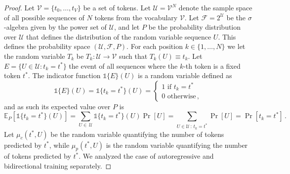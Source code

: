 \begin{proof}
%
Let $\mathcal{V} = \{t_0, \dots, t_V\}$ be a set of tokens.
%
Let \( \mathcal{U} = \mathcal{V}^N \) denote the sample space of all possible sequences of \( N \) tokens from the vocabulary \( \mathcal{V} \). 
%
Let \( \mathcal{F} = 2^{\mathcal{U}} \) be the \(\sigma\)-algebra given by the power set of \( \mathcal{U} \), and let \( P \) be the probability distribution over \( \mathcal{U} \) that defines the distribution of the random variable sequence \( U \). 
%
This defines the probability space \( (\mathcal{U}, \mathcal{F}, P) \).
%
For each position $k \in \{1, \dots, N\}$ we let the random variable $T_k$ be $T_k: \mathcal{U} \rightarrow \mathcal{V}$ such that $T_k(U) \equiv t_k$.
%
Let $E = \{U \in \mathcal{U}: t_k = t^*\}$ the event of all sequences where the $k$-th token is a fixed token $t^*$. 
%
The indicator function $\mathds{1}\{E\}(U)$ is a random variable defined as
%
\begin{equation}
\mathds{1}\{E\}(U) = \mathds{1}\{t_k = t^*\}(U) =
\begin{cases}
    1 \,\,\text{if} \,\,t_k = t^*\\
    0 \,\, \text{otherwise} \,,
\end{cases}
\end{equation}
%
and as such its expected value over $P$ is
%
\begin{equation}
\mathbb{E}_P\left[\mathds{1}\{t_k = t^*\}(U)\right] = \sum_{U \in \,\mathcal{U}} \mathds{1}\{t_k = t^*\}(U)\Pr[U] = \sum_{U \in \mathcal{U} \,:\, t_k = t^*} \Pr[U] = \Pr[t_k = t^*] \,.
\end{equation}
%  
Let $\mu_c(t^*, U)$ be the random variable quantifying the number of tokens predicted by $t^*$, while $\mu_p(t^*, U)$ is the random variable quantifying the number of tokens predicted by $t^*$.
%
We analyzed the case of autoregressive and bidirectional training separately.
%


\end{proof}
